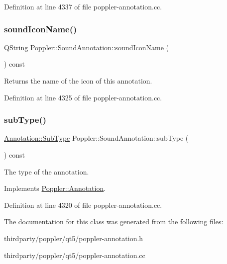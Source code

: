 Definition at line 4337 of file poppler-\/annotation.\+cc.

\mbox{\label{class_poppler_1_1_sound_annotation_a7d92e049c31d42255995411463bb0fb0}} 
\subsubsection{\texorpdfstring{sound\+Icon\+Name()}{soundIconName()}}
{\footnotesize\ttfamily Q\+String Poppler\+::\+Sound\+Annotation\+::sound\+Icon\+Name (\begin{DoxyParamCaption}{ }\end{DoxyParamCaption}) const}

Returns the name of the icon of this annotation. 

Definition at line 4325 of file poppler-\/annotation.\+cc.

\mbox{\label{class_poppler_1_1_sound_annotation_af66d5ce084a1ac8ad21a2102942bf909}} 
\subsubsection{\texorpdfstring{sub\+Type()}{subType()}}
{\footnotesize\ttfamily \hyperlink{class_poppler_1_1_annotation_a2d592999c330949d64679cfa9e81113f}{Annotation\+::\+Sub\+Type} Poppler\+::\+Sound\+Annotation\+::sub\+Type (\begin{DoxyParamCaption}{ }\end{DoxyParamCaption}) const\hspace{0.3cm}{\ttfamily [virtual]}}

The type of the annotation. 

Implements \hyperlink{class_poppler_1_1_annotation_aef7fa1532193b41fbeba6e577579d984}{Poppler\+::\+Annotation}.



Definition at line 4320 of file poppler-\/annotation.\+cc.



The documentation for this class was generated from the following files\+:\begin{DoxyCompactItemize}
\item 
thirdparty/poppler/qt5/poppler-\/annotation.\+h\item 
thirdparty/poppler/qt5/poppler-\/annotation.\+cc\end{DoxyCompactItemize}
